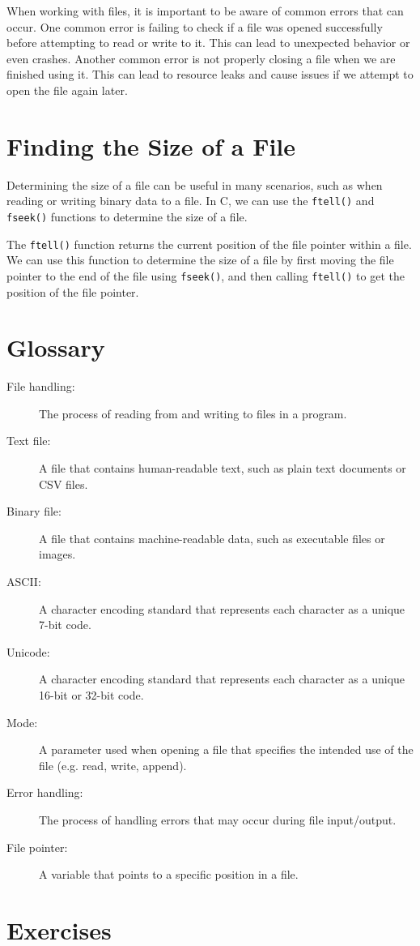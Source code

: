 When working with files, it is important to be aware of common errors that can
occur. One common error is failing to check if a file was opened successfully
before attempting to read or write to it. This can lead to unexpected behavior
or even crashes. Another common error is not properly closing a file when we
are finished using it. This can lead to resource leaks and cause issues if we
attempt to open the file again later.

\section{Finding the Size of a File}

Determining the size of a file can be useful in many scenarios, such as when reading or writing binary data to a file. In C, we can use the {\tt ftell()} and {\tt fseek()} functions to determine the size of a file.

The {\tt ftell()} function returns the current position of the file pointer within a file. We can use this function to determine the size of a file by first moving the file pointer to the end of the file using {\tt fseek()}, and then calling {\tt ftell()} to get the position of the file pointer.

\section{Glossary}

\begin{description}
	\item[File handling:] The process of reading from and writing to files in a program.
	\item[Text file:] A file that contains human-readable text, such as plain text documents or CSV files.
	\item[Binary file:] A file that contains machine-readable data, such as executable files or images.
	\item[ASCII:] A character encoding standard that represents each character as a unique 7-bit code.
	\item[Unicode:] A character encoding standard that represents each character as a unique 16-bit or 32-bit code.
	\item[Mode:] A parameter used when opening a file that specifies the intended use of the file (e.g. read, write, append).
	\item[Error handling:] The process of handling errors that may occur during file input/output.
	\item[File pointer:] A variable that points to a specific position in a file.
\end{description}

\section{Exercises}
\setcounter{exercisenum}{0}




